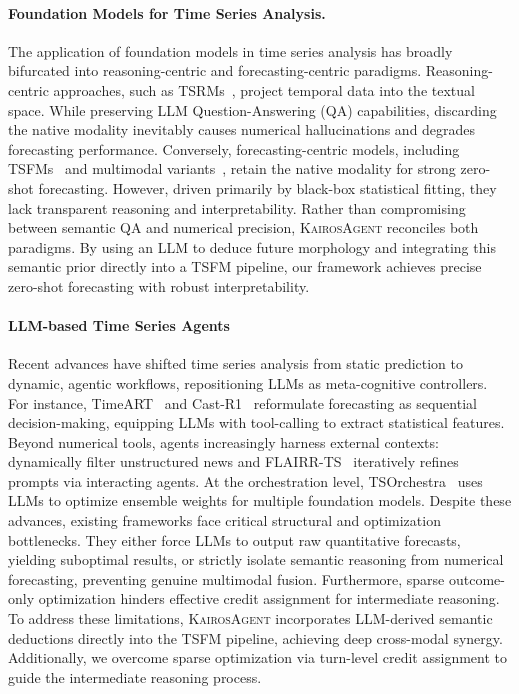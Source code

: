 \documentclass[11pt]{article}
\newcommand{\method}{\textsc{KairosAgent}\xspace}
\begin{document}
\paragraph{Foundation Models for Time Series Analysis.}

The application of foundation models in time series analysis has broadly bifurcated into reasoning-centric and forecasting-centric paradigms.
Reasoning-centric approaches, such as TSRMs~\citep{kong2025time, xie2025chatts, bazaga2025learning}, project temporal data into the textual space.
While preserving LLM Question-Answering (QA) capabilities, discarding the native modality inevitably causes numerical hallucinations and degrades forecasting performance.
Conversely, forecasting-centric models, including TSFMs~\citep{feng2025kairos,liu2025sundial,auer2026tirex} and multimodal variants~\citep{wu2025aurora}, retain the native modality for strong zero-shot forecasting.
However, driven primarily by black-box statistical fitting, they lack transparent reasoning and interpretability.
Rather than compromising between semantic QA and numerical precision, \method reconciles both paradigms.
By using an LLM to deduce future morphology and integrating this semantic prior directly into a TSFM pipeline, our framework achieves precise zero-shot forecasting with robust interpretability.

\paragraph{LLM-based Time Series Agents}
Recent advances have shifted time series analysis from static prediction to dynamic, agentic workflows, repositioning LLMs as meta-cognitive controllers.
For instance, TimeART~\citep{wu2026timeart} and Cast-R1~\citep{tao2026cast} reformulate forecasting as sequential decision-making, equipping LLMs with tool-calling to extract statistical features.
Beyond numerical tools, agents increasingly harness external contexts: \citet{wang2024news} dynamically filter unstructured news
and FLAIRR-TS~\citep{jalori2025flairr} iteratively refines prompts via interacting agents.
At the orchestration level, TSOrchestra~\citep{cao2025conversational} uses LLMs to optimize ensemble weights for multiple foundation models.
Despite these advances, existing frameworks face critical structural and optimization bottlenecks.
They either force LLMs to output raw quantitative forecasts, yielding suboptimal results, or strictly isolate semantic reasoning from numerical forecasting, preventing genuine multimodal fusion.
Furthermore, sparse outcome-only optimization hinders effective credit assignment for intermediate reasoning.
To address these limitations, \method incorporates LLM-derived semantic deductions directly into the TSFM pipeline, achieving deep cross-modal synergy. 
Additionally, we overcome sparse optimization via turn-level credit assignment to guide the intermediate reasoning process.
\end{document}
